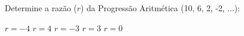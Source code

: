Determine a razão ($r$) da Progressão Aritmética (10, 6, 2, -2, ...):

$r=-4$
$r=4$
$r=-3$
$r=3$
$r=0$




